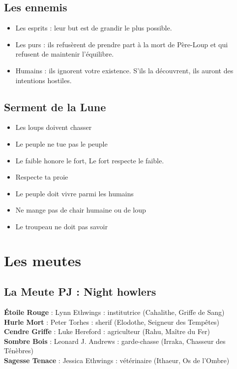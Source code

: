 \documentclass[oneside,12pt]{book}
\newcommand{\Lynn}{\textbf{Étoile Rouge} }
\newcommand{\Jessica}{\textbf{Sagesse Tenace} }
\newcommand{\Luke}{\textbf{Cendre Griffe} }
\newcommand{\Peter}{\textbf{Hurle Mort} }
\newcommand{\Leonard}{\textbf{Sombre Bois} }
\begin{document}
\begin{flushleft}
\subsection{Les ennemis}
\begin{itemize}
\item Les esprits : leur but est de grandir le plus possible.
\item Les purs : ils refusèrent de prendre part à la mort de Père-Loup et qui refusent de maintenir l'équilibre.
\item Humains : ils ignorent votre existence. S’ils la découvrent, ils auront des intentions hostiles.
\end{itemize}


\subsection{Serment de la Lune}
\begin{itemize}
\item Les loups doivent chasser
\item Le peuple ne tue pas le peuple
\item Le faible honore le fort, Le fort respecte le faible.
\item Respecte ta proie
\item Le peuple doit vivre parmi les humains
\item Ne mange pas de chair humaine ou de loup
\item Le troupeau ne doit pas savoir
\end{itemize}

  
\clearpage
\section{Les meutes}
\subsection{La Meute PJ : Night howlers}
\Lynn : Lynn Ethwings :  institutrice (Cahalithe, Griffe de Sang) \\
\Peter : Peter Torhes : sherif (Elodothe, Seigneur des Tempêtes) \\
\Luke : Luke Hereford : agriculteur (Rahu, Maître du Fer)\\
\Leonard : Leonard J. Andrews : garde-chasse (Irraka, Chasseur des Ténèbres)\\
\Jessica : Jessica  Ethwings : vétérinaire (Ithaeur, Os de l'Ombre)\\


\end{flushleft}
\end{document}
